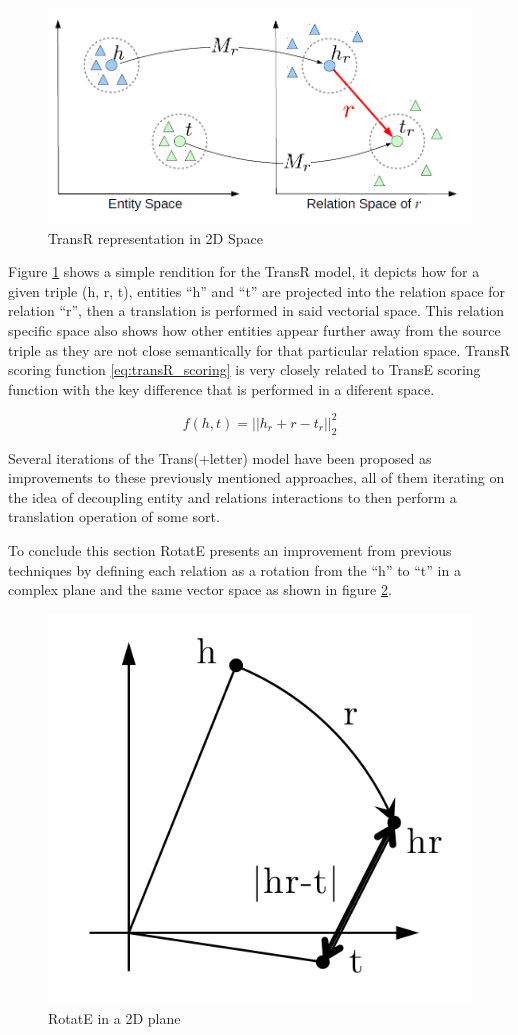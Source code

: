 \begin{figure}[!htp]
    \centering
    \includegraphics[width=.7\textwidth]{fig/embeddings/TransR.png}
    \caption{TransR representation in 2D Space}
    \label{fig:emb-transR}
\end{figure}

Figure \ref{fig:emb-transR} shows a simple rendition for the TransR model, it depicts how for a given triple (h, r, t), entities ``h'' and ``t'' are projected into the relation space for relation ``r'', then a translation is performed in said vectorial space. This relation specific space also shows how other entities appear further away from the source triple as they are not close semantically for that particular relation space. TransR scoring function \ref{eq:transR_scoring} is very closely related to TransE scoring function with the key difference that is performed in a diferent space.

\begin{equation}
    \label{eq:transR_scoring}
    f(h, t) = ||h_r + r - t_r||^2_2
\end{equation}

Several iterations of the Trans(+letter) model have been proposed as improvements to these previously mentioned approaches, all of them iterating on the idea of decoupling entity and relations interactions to then perform a translation operation of some sort.

To conclude this section RotatE\cite{} presents an improvement from previous techniques by defining each relation as a rotation from the ``h'' to ``t'' in a complex plane and the same vector space as shown in figure \ref{fig:emb-rotatE}.

\begin{figure}[!htp]
    \centering
    \includegraphics[width=.4\textwidth]{fig/embeddings/RotatE.png}
    \caption{RotatE in a 2D plane}
    \label{fig:emb-rotatE}
\end{figure}


